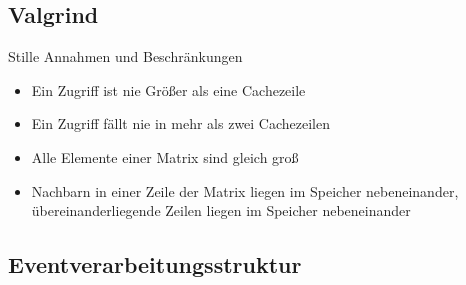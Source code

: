 \subsection{Valgrind} 

\begin{frame}
        \begin{block}{Stille Annahmen und Beschränkungen}
                \begin{itemize}
                        \pause \item Ein Zugriff ist nie Größer als eine Cachezeile
                               \item Ein Zugriff fällt nie in mehr als zwei Cachezeilen
                        \pause \item Alle Elemente einer Matrix sind gleich groß
                        \pause \item Nachbarn in einer Zeile der Matrix liegen im Speicher nebeneinander, übereinanderliegende Zeilen liegen im Speicher nebeneinander
                \end{itemize}
        \end{block}
\end{frame}

\subsection{Eventverarbeitungsstruktur} 
